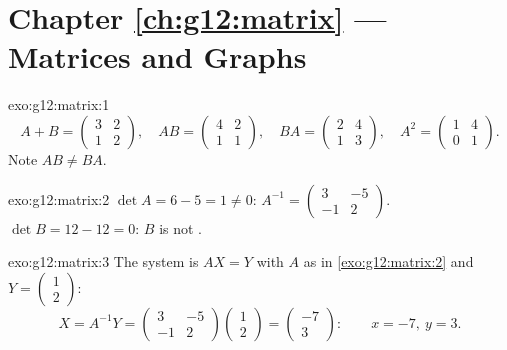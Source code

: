 \section*{Chapter \ref{ch:g12:matrix} --- Matrices and Graphs}

\begin{solution}{exo:g12:matrix:1}
\[
A + B = \begin{pmatrix} 3 & 2\\ 1 & 2\end{pmatrix}, \quad
AB = \begin{pmatrix} 4 & 2\\ 1 & 1\end{pmatrix}, \quad
BA = \begin{pmatrix} 2 & 4\\ 1 & 3\end{pmatrix}, \quad
A^2 = \begin{pmatrix} 1 & 4\\ 0 & 1\end{pmatrix}.
\]
Note $AB \neq BA$.
\end{solution}

\begin{solution}{exo:g12:matrix:2}
$\det A = 6 - 5 = 1 \neq 0$:
$A^{-1} = \begin{pmatrix} 3 & -5\\ -1 & 2 \end{pmatrix}$.
$\det B = 12 - 12 = 0$: $B$ is not .
\end{solution}

\begin{solution}{exo:g12:matrix:3}
The system is $AX = Y$ with $A$ as in \cref{exo:g12:matrix:2} and
$Y = \begin{pmatrix} 1\\ 2\end{pmatrix}$:
\[
X = A^{-1}Y = \begin{pmatrix} 3 & -5\\ -1 & 2\end{pmatrix}
\begin{pmatrix} 1\\ 2\end{pmatrix}
= \begin{pmatrix} -7\\ 3\end{pmatrix}:
\qquad x = -7,\ y = 3 .
\]
\end{solution}

